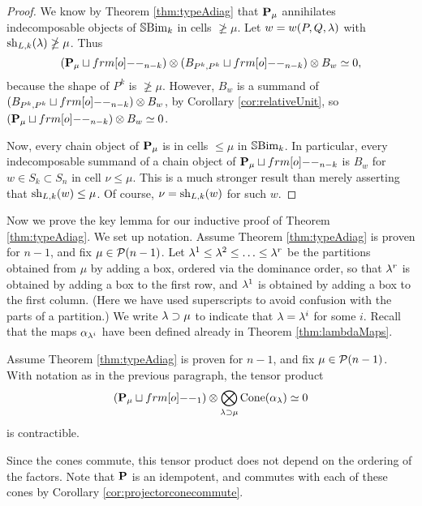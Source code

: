 \begin{proof} We know by Theorem \ref{thm:typeAdiag} that ${\mathbf P}_\mu$ annihilates indecomposable objects of ${\mathbb{S}}{\rm Bim }_{k}$ in cells $\ngeq \mu$. Let $w = w(P,Q,\lambda)$ with $\operatorname{sh}_{L,k}(\lambda) \ngeq \mu$. Thus
\begin{equation} (\PB_\mu \sqcup \one_{n-k}) \ot (B_{P^k,P^k} \sqcup \one_{n-k}) \ot B_w \simeq 0, \end{equation}
because the shape of $P^k$ is $\ngeq \mu$. However, $B_w$ is a summand of $(B_{P^k,P^k} \sqcup \one_{n-k}) \ot B_w$, by Corollary \ref{cor:relativeUnit}, so $(\PB_\mu \sqcup \one_{n-k}) \ot B_w \simeq 0$.

Now, every chain object of ${\mathbf P}_\mu$ is in cells $\le \mu$ in ${\mathbb{S}}{\rm Bim }_k$. In particular, every indecomposable summand of a chain object of $\PB_\mu \sqcup \one_{n-k}$ is $B_w$ for $w \in S_k \subset S_n$ in cell $\nu \le \mu$. This is a much stronger result than merely asserting that $\operatorname{sh}_{L,k}(w) \le \mu$. Of course, $\nu = \operatorname{sh}_{L,k}(w)$ for such $w$.  \end{proof}

Now we prove the key lemma for our inductive proof of Theorem \ref{thm:typeAdiag}. We set up notation. Assume Theorem \ref{thm:typeAdiag} is proven for $n-1$, and fix $\mu \in {\mathcal{P}}(n-1)$. Let $\lambda^1 \le \lambda^2 \le \ldots \le \lambda^r$ be the partitions obtained from $\mu$ by adding a box, ordered via the dominance order, so that $\lambda^r$ is obtained by adding a box to the first row, and $\lambda^1$ is obtained by adding a box to the first column. (Here we have used superscripts to avoid confusion with the parts of a partition.) We write $\lambda \supset \mu$ to indicate that $\lambda = \lambda^i$ for some $i$. Recall that the maps $\alpha_{\lambda^i}$ have been defined already in Theorem \ref{thm:lambdaMaps}. 

\begin{lemma} \label{lem:relprojcones} Assume Theorem \ref{thm:typeAdiag} is proven for $n-1$, and fix $\mu \in {\mathcal{P}}(n-1)$. With notation as in the previous paragraph, the tensor product
\begin{equation}\label{eq:reltensorprod}
(\PB_{\mu}\sqcup \one_1) \otimes \bigotimes_{\l\supset \mu} \Cone(\a_\l) \simeq 0
\end{equation}
is contractible. \end{lemma}

Since the cones commute, this tensor product does not depend on the ordering of the factors. Note that ${\mathbf P}$ is an idempotent, and commutes with each of these cones by Corollary \ref{cor:projectorconecommute}.


